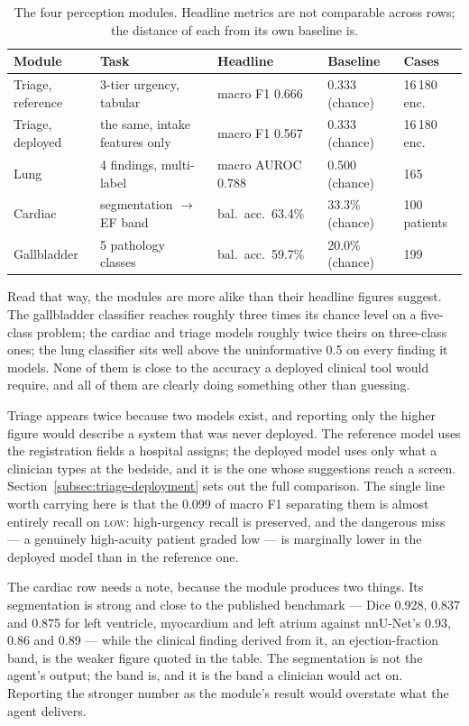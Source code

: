 \begin{table}[H]
  \centering
  \small
  \caption{The four perception modules. Headline metrics are not comparable across rows;
    the distance of each from its own baseline is.}
  \label{tab:modules-side-by-side}
  \begin{tabularx}{\textwidth}{@{}lXlll@{}}
    \toprule
    Module & Task & Headline & Baseline & Cases \\
    \midrule
    Triage, reference & 3-tier urgency, tabular & macro F1 0.666 & 0.333 (chance) &
      16\,180 enc. \\
    Triage, deployed & the same, intake features only & macro F1 0.567 & 0.333 (chance) &
      16\,180 enc. \\
    Lung & 4 findings, multi-label & macro AUROC 0.788 & 0.500 (chance) & 165 \\
    Cardiac & segmentation $\rightarrow$ EF band & bal.\ acc.\ 63.4\% & 33.3\% (chance) &
      100 patients \\
    Gallbladder & 5 pathology classes & bal.\ acc.\ 59.7\% & 20.0\% (chance) & 199 \\
    \bottomrule
  \end{tabularx}
\end{table}

Read that way, the modules are more alike than their headline figures suggest. The gallbladder
classifier reaches roughly three times its chance level on a five-class problem; the cardiac
and triage models roughly twice theirs on three-class ones; the lung classifier sits well above
the uninformative 0.5 on every finding it models. None of them is close to the accuracy a
deployed clinical tool would require, and all of them are clearly doing something other than
guessing.

Triage appears twice because two models exist, and reporting only the higher figure would
describe a system that was never deployed. The reference model uses the registration fields a
hospital assigns; the deployed model uses only what a clinician types at the bedside, and it is
the one whose suggestions reach a screen. Section~\ref{subsec:triage-deployment} sets out the
full comparison. The single line worth carrying here is that the 0.099 of macro F1 separating
them is almost entirely recall on \textsc{low}: high-urgency recall is preserved, and the
dangerous miss --- a genuinely high-acuity patient graded low --- is marginally lower in the
deployed model than in the reference one.

The cardiac row needs a note, because the module produces two things. Its segmentation is
strong and close to the published benchmark --- Dice 0.928, 0.837 and 0.875 for left ventricle,
myocardium and left atrium against nnU-Net's 0.93, 0.86 and 0.89 --- while the clinical finding
derived from it, an ejection-fraction band, is the weaker figure quoted in the table. The
segmentation is not the agent's output; the band is, and it is the band a clinician would act
on. Reporting the stronger number as the module's result would overstate what the agent
delivers.

